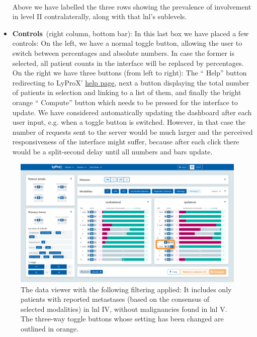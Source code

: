 \documentclass[\relativeRoot/main.tex]{subfiles}
\begin{document}
\begin{itemize}
\\
    [3mm]
    Above we have labelled the three rows showing the prevalence of involvement in level II contralaterally, along with that \gls{lnl}'s sublevels.
    \item \textbf{Controls}~(right column, bottom bar): In this last box we have placed a few controls: On the left, we have a normal toggle button, allowing the user to switch between percentages and absolute numbers. In case the former is selected, all patient counts in the interface will be replaced by percentages. On the right we have three buttons (from left to right): The `` Help'' button redirecting to LyProX' \href{https://lyprox/dashboard/help}{help page}, next a button displaying the total number of patients in selection and linking to a list of them, and finally the bright orange `` Compute'' button which needs to be pressed for the interface to update. We have considered automatically updating the dashboard after each user input, e.g. when a toggle button is switched. However, in that case the number of requests sent to the server would be much larger and the perceived responsiveness of the interface might suffer, because after each click there would be a split-second delay until all numbers and bars update.
\end{itemize}

\begin{figure}
    \centering
    \includegraphics[width=1.0\textwidth, frame]{figures/data_viewer_lnl_example.png}
    \caption[
        The data viewer showing a scenario of two involved LNLs
    ]{
        The data viewer with the following filtering applied: It includes only patients with reported metastases (based on the consensus of selected modalities) in \gls{lnl} IV, without malignancies found in \gls{lnl} V. The three-way toggle buttons whose setting has been changed are outlined in orange.
    }
    \label{fig:lyprox:data_viewer_lnl_example}
\end{figure}
\end{document}
